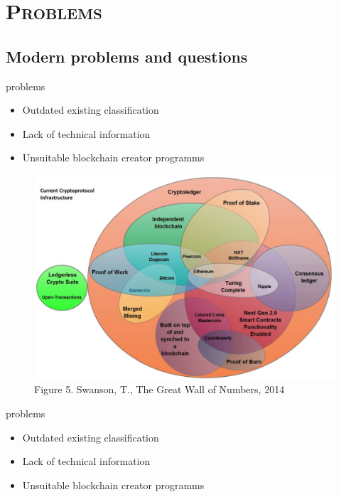 \documentclass[xcolor=x11names,compress]{beamer}
\renewcommand{\(}{\begin{columns}}
\renewcommand{\)}{\end{columns}}
\newcommand{\<}[1]{\begin{column}{#1}}
\renewcommand{\>}{\end{column}}
\begin{document}
\section{\scshape Problems} %
\subsection{Modern problems and questions}
\begin{frame}{problems}
\begin{itemize}
        \item Outdated existing classification
        \item Lack of technical information
        \item Unsuitable blockchain creator programms
\end{itemize}
\end{frame}

\begin{frame}
    \begin{figure}
        \includegraphics[scale=0.35]{./images/curr}
        \caption{\tiny Figure 5. Swanson, T., The Great Wall of Numbers, 2014}
    \end{figure}
\end{frame}

\begin{frame}{problems}
\begin{itemize}
        \item Outdated existing classification
        \item Lack of technical information
        \item Unsuitable blockchain creator programms
\end{itemize}
\end{frame}
\end{document}
